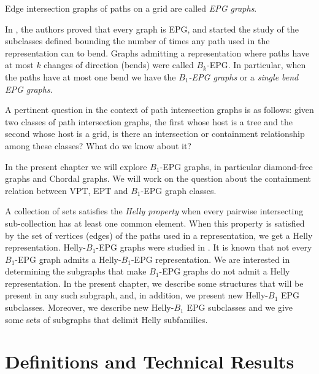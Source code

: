 Edge intersection graphs of paths on a grid are called \textit{EPG graphs}. 

In \citeauthor{golumbic2009} \cite{golumbic2009}, the authors proved that every graph is EPG, and started the study of the subclasses
defined bounding the number of times any path used in the representation can to bend.  Graphs admitting a representation
where  paths  have at most $k$ changes of direction  (bends) were called $B_k$-EPG. 
 In particular, when the paths have at most one bend we have the \textit{ $B_1$-EPG graphs} or a \textit{single bend EPG graphs}.

 A pertinent question in the context of path intersection graphs is as follows: given two classes of path intersection graphs,
 the first whose host is a tree and the second whose host is a grid,  is there an intersection or containment relationship among these classes? What do we know about it?

In the present chapter we will explore $B_1$-EPG graphs, in particular diamond-free graphs and Chordal graphs. We will work on the question about the containment relation between  VPT, EPT and $B_1$-EPG graph classes.


 A collection  of sets satisfies the \textit{Helly property} when every pairwise intersecting sub-collection  has at least one common element. When this property
 is satisfied by the set of vertices (edges) of the paths used in a representation, we get a Helly representation.  Helly-$B_1$-EPG graphs were studied
 in \cite{bornstein2019, dmtcs:6506}.                                     
It is known that not every $B_1$-EPG graph admits a Helly-$B_1$-EPG representation. We are interested in determining the subgraphs that make
$B_1$-EPG graphs do not admit a Helly representation. In the present chapter, we describe some structures that will be present in any such subgraph,
and, in addition, we present new  Helly-$B_1$ EPG  subclasses.
Moreover,  we  describe new  Helly-$B_1$ EPG  subclasses %
and we give some sets of subgraphs that delimit Helly subfamilies.   
\section{Definitions and Technical Results}

